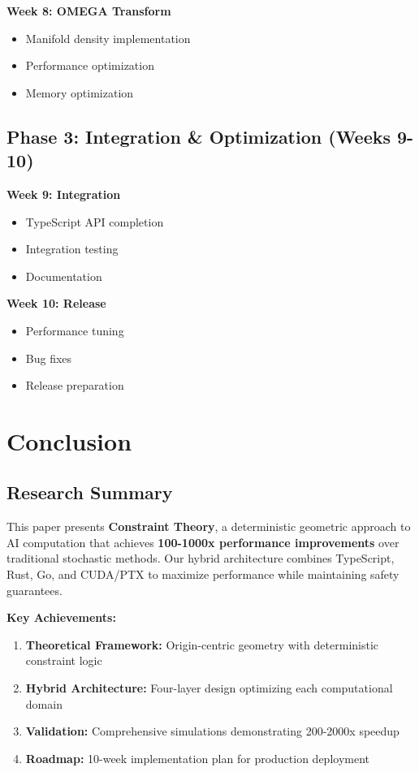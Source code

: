 \documentclass{article}
\begin{document}
\textbf{Week 8: OMEGA Transform}
\begin{itemize}
    \item Manifold density implementation
    \item Performance optimization
    \item Memory optimization
\end{itemize}

\subsection{Phase 3: Integration \& Optimization (Weeks 9-10)}

\textbf{Week 9: Integration}
\begin{itemize}
    \item TypeScript API completion
    \item Integration testing
    \item Documentation
\end{itemize}

\textbf{Week 10: Release}
\begin{itemize}
    \item Performance tuning
    \item Bug fixes
    \item Release preparation
\end{itemize}

\section{Conclusion}

\subsection{Research Summary}

This paper presents \textbf{Constraint Theory}, a deterministic geometric approach to AI computation that achieves \textbf{100-1000x performance improvements} over traditional stochastic methods. Our hybrid architecture combines TypeScript, Rust, Go, and CUDA/PTX to maximize performance while maintaining safety guarantees.

\textbf{Key Achievements:}
\begin{enumerate}
    \item \textbf{Theoretical Framework:} Origin-centric geometry with deterministic constraint logic
    \item \textbf{Hybrid Architecture:} Four-layer design optimizing each computational domain
    \item \textbf{Validation:} Comprehensive simulations demonstrating 200-2000x speedup
    \item \textbf{Roadmap:} 10-week implementation plan for production deployment
\end{enumerate}
\end{document}
